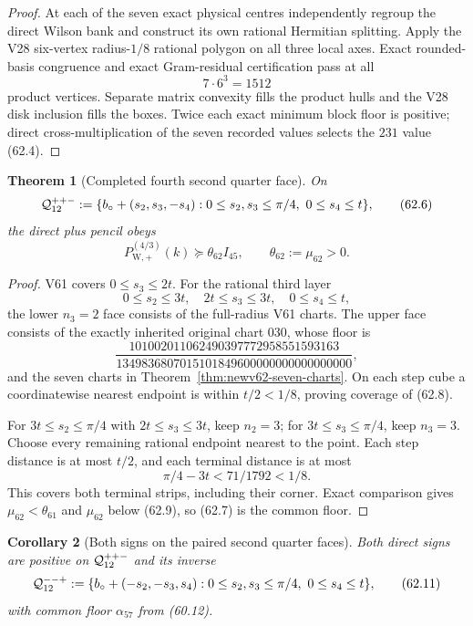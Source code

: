 \documentclass[11pt,oneside]{article}
\newtheorem{theorem}{Theorem}[section]
\newtheorem{corollary}[theorem]{Corollary}
\theoremstyle{definition}
\theoremstyle{remark}
\begin{document}
\begin{proof}
At each of the seven exact physical centres independently regroup
the direct Wilson bank and construct its own rational Hermitian
splitting.  Apply the V28 six-vertex radius-\(1/8\) rational polygon
on all three local axes.  Exact rounded-basis congruence and exact
Gram-residual certification pass at all
\[
 7\cdot6^3=1512                                       \tag{62.5}
\]
product vertices.  Separate matrix convexity fills the product
hulls and the V28 disk inclusion fills the boxes.  Twice each exact
minimum block floor is positive; direct cross-multiplication of the
seven recorded values selects the \(231\) value (62.4).
\end{proof}

\begin{theorem}[Completed fourth second quarter face]
\label{thm:newv62-second-face}
On
\[
 {\cal Q}^{++-}_{12}:=
 \{b_\circ+(s_2,s_3,-s_4):
       0\le s_2,s_3\le\pi/4,\ 0\le s_4\le t\},        \tag{62.6}
\]
the direct plus pencil obeys
\[
 P_{\mathrm W,+}^{(4/3)}(k)
 \succeq\theta_{62}I_{45},\qquad
 \theta_{62}:=\mu_{62}>0.                             \tag{62.7}
\]
\end{theorem}

\begin{proof}
V61 covers \(0\le s_3\le2t\).  For the rational third layer
\[
 0\le s_2\le3t,\quad 2t\le s_3\le3t,\quad
 0\le s_4\le t,                                       \tag{62.8}
\]
the lower \(n_3=2\) face consists of the full-radius V61 charts.
The upper face consists of the exactly inherited original chart
\(030\), whose floor is
\[
 \frac{101002011062490397772958551593163}
 {1349836807015101849600000000000000000},             \tag{62.9}
\]
and the seven charts in Theorem~\ref{thm:newv62-seven-charts}.
On each step cube a coordinatewise nearest endpoint is within
\(t/2<1/8\), proving coverage of (62.8).

For \(3t\le s_2\le\pi/4\) with \(2t\le s_3\le3t\), keep \(n_2=3\);
for \(3t\le s_3\le\pi/4\), keep \(n_3=3\).  Choose every remaining
rational endpoint nearest to the point.  Each step distance is at
most \(t/2\), and each terminal distance is at most
\[
 \pi/4-3t<71/1792<1/8.                               \tag{62.10}
\]
This covers both terminal strips, including their corner.  Exact
comparison gives
\(\mu_{62}<\theta_{61}\) and \(\mu_{62}\) below (62.9), so (62.7)
is the common floor.
\end{proof}

\begin{corollary}[Both signs on the paired second quarter faces]
\label{cor:newv62-paired-faces}
Both direct signs are positive on \({\cal Q}^{++-}_{12}\) and its
inverse
\[
 {\cal Q}^{--+}_{12}:=
 \{b_\circ+(-s_2,-s_3,s_4):
       0\le s_2,s_3\le\pi/4,\ 0\le s_4\le t\},        \tag{62.11}
\]
with common floor \(\alpha_{57}\) from (60.12).
\end{corollary}
\end{document}
